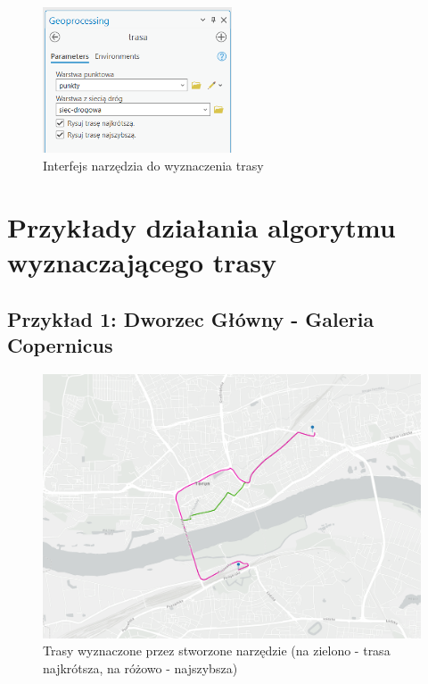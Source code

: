 \documentclass{article}
\begin{document}
\begin{figure}[H]
    \centering
    \includegraphics[width=0.5\textwidth]{img/narzedzie-interfejs-trasa.png}
    \caption{Interfejs narzędzia do wyznaczenia trasy}
\end{figure}

\section{Przykłady działania algorytmu wyznaczającego trasy}
\subsection{Przykład 1: Dworzec Główny - Galeria Copernicus}
\begin{figure}[H]
    \centering
    \includegraphics[width=1\textwidth]{img/glowny-copernicus.png}
    \caption{Trasy wyznaczone przez stworzone narzędzie (na zielono - trasa najkrótsza, na różowo - najszybsza)}
\end{figure}
\end{document}

